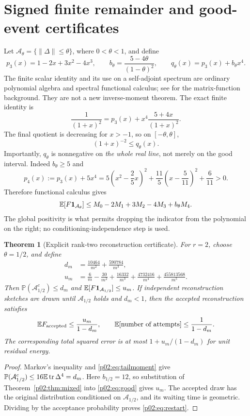 \documentclass[11pt]{article}
\numberwithin{equation}{section}
\newtheorem{theorem}{Theorem}[section]
\theoremstyle{definition}\newtheorem{definition}[theorem]{Definition}
\theoremstyle{remark}\newtheorem{remark}[theorem]{Remark}
\newcommand{\tr}{\operatorname{tr}}\newcommand{\Ent}{\operatorname{Ent}}
\newcommand{\norm}[1]{\lVert#1\rVert}\newcommand{\ip}[2]{\langle#1,#2\rangle}
\newcommand{\PP}{\mathbb P}
\begin{document}
\par{}
\section{Signed finite remainder and good-event certificates}\label{p02:sec:good}
Let \(\mathcal A_\theta=\{\norm \Delta\le\theta\}\), where \(0<\theta<1\), and define
\[
 p_3(x)=1-2x+3x^2-4x^3,\qquad
 b_\theta=\frac{5-4\theta}{(1-\theta)^2},\qquad
 q_\theta(x)=p_3(x)+b_\theta x^4.
\]
The finite scalar identity and its use on a self-adjoint spectrum are
ordinary polynomial algebra and spectral functional calculus; see
\cite[Chapter~1]{Higham} for the matrix-function background.
They are not a new inverse-moment theorem. The exact finite identity is
\begin{equation}\label{p02:eq:remainder3}
 \frac1{(1+x)^2}=p_3(x)+x^4\frac{5+4x}{(1+x)^2}.
\end{equation}
The final quotient is decreasing for \(x>-1\), so on \([-\theta,\theta]\),
\[
 (1+x)^{-2}\le q_\theta(x).
\]
Importantly, \(q_\theta\) is nonnegative on \emph{the whole real line}, not merely on the good interval. Indeed \(b_\theta\ge5\) and
\[
 p_4(x):=p_3(x)+5x^4
 =5\left(x^2-\frac25x\right)^2+
 \frac{11}5\left(x-\frac5{11}\right)^2+\frac6{11}>0.
\]
Therefore functional calculus gives
\begin{equation}\label{p02:eq:good}
 \mathbb E[F\mathbf1_{\mathcal A_\theta}]
 \le M_0-2M_1+3M_2-4M_3+b_\theta M_4.
\end{equation}
The global positivity is what permits dropping the indicator from the polynomial on the right; no conditioning-independence step is used.

\begin{theorem}[Explicit rank-two reconstruction certificate]\label{p02:thm:restart}
For \(r=2\), choose \(\theta=1/2\), and define
\begin{align*}
 d_m&=\frac{10464}{m^2}+\frac{590784}{m^3},\\
 u_m&=\frac6m-\frac{30}{m^2}+\frac{16332}{m^3}
       +\frac{4732416}{m^4}+\frac{455813568}{m^5}.
\end{align*}
Then \(\PP(\mathcal A_{1/2}^c)\le d_m\) and
\(\mathbb E[F\mathbf1_{\mathcal A_{1/2}}]\le u_m\).
If independent reconstruction sketches are drawn until \(\mathcal A_{1/2}\) holds and \(d_m<1\), then the accepted reconstruction satisfies
\begin{equation}\label{p02:eq:restart}
 \mathbb E F_{\rm accepted}\le\frac{u_m}{1-d_m},\qquad
 \mathbb E[\text{number of attempts}]\le\frac1{1-d_m}.
\end{equation}
The corresponding total squared error is at most \(1+u_m/(1-d_m)\) for unit residual energy.
\end{theorem}
\begin{proof}
Markov's inequality and \eqref{p02:eq:tailmoment} give
\(\PP(\mathcal A_{1/2}^c)\le16\E\tr \Delta^4=d_m\).
Here \(b_{1/2}=12\), so substitution of Theorem~\ref{p02:thm:mixed} into \eqref{p02:eq:good} gives \(u_m\). The accepted draw has the original distribution conditioned on \(\mathcal A_{1/2}\), and its waiting time is geometric. Dividing by the acceptance probability proves \eqref{p02:eq:restart}.
\end{proof}
\end{document}

